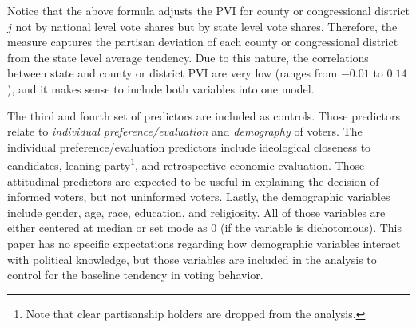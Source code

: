 \documentclass[doc,natbib,12pt]{apa6}\usepackage[]{graphicx}\usepackage[]{color}
\begin{document}
    \noindent Notice that the above formula adjusts the PVI for county or congressional district $j$ not by national level vote shares but by state level vote shares. Therefore, the measure captures the partisan deviation of each county or congressional district from the state level average tendency. Due to this nature, the correlations between state and county or district PVI are very low (ranges from $-0.01$ to $0.14$), and it makes sense to include both variables into one model.
    
    
    \par The third and fourth set of predictors are included as controls. Those predictors relate to \textit{individual preference/evaluation} and \textit{demography} of voters. The individual preference/evaluation predictors include ideological closeness to candidates, leaning party\footnote{Note that clear partisanship holders are dropped from the analysis.}, and retrospective economic evaluation. Those attitudinal predictors are expected to be useful in explaining the decision of informed voters, but not uninformed voters. Lastly, the demographic variables include gender, age, race, education, and religiosity. All of those variables are either centered at median or set mode as 0 (if the variable is dichotomous). This paper has no specific expectations regarding how demographic variables interact with political knowledge, but those variables are included in the analysis to control for the baseline tendency in voting behavior.  
    
\end{document}
